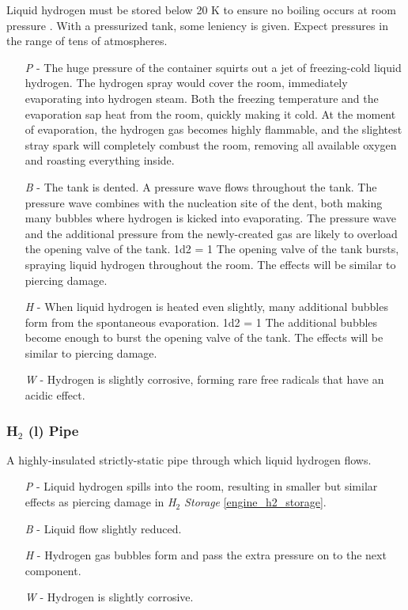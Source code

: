\documentclass[a4paper]{article}
\begin{document}
Liquid hydrogen must be stored below 20 K to ensure no boiling occurs at room pressure \cite{international_temperature_scale_of_1968}. With a pressurized tank, some leniency is given. Expect pressures in the range of tens of atmospheres.
\begin{enumerate}
\item [\textit{P}] - The huge pressure of the container squirts out a jet of freezing-cold liquid hydrogen. The hydrogen spray would cover the room, immediately evaporating into hydrogen steam. Both the freezing temperature and the evaporation sap heat from the room, quickly making it cold. At the moment of evaporation, the hydrogen gas becomes highly flammable, and the slightest stray spark will completely combust the room, removing all available oxygen and roasting everything inside.
\item [\textit{B}] - The tank is dented. A pressure wave flows throughout the tank. The pressure wave combines with the nucleation site of the dent, both making many bubbles where hydrogen is kicked into evaporating. The pressure wave and the additional pressure from the newly-created gas are likely to overload the opening valve of the tank. \newline \hspace{-3pt} 1d2 = 1 The opening valve of the tank bursts, spraying liquid hydrogen throughout the room. The effects will be similar to piercing damage.
\item [\textit{H}] - When liquid hydrogen is heated even slightly, many additional bubbles form from the spontaneous evaporation. \newline \hspace{3pt} 1d2 = 1 The additional bubbles become enough to burst the opening valve of the tank. The effects will be similar to piercing damage.
\item [\textit{W}] - Hydrogen is slightly corrosive, forming rare free radicals that have an acidic effect.
\end{enumerate}

\vspace{-0.5cm} \hspace{-18pt} \subsubsection{H$_2$ (l) Pipe} \label{engine_h2_pipe} \vspace{-0.2cm}
A highly-insulated strictly-static pipe through which liquid hydrogen flows.
\begin{enumerate}
\item [\textit{P}] - Liquid hydrogen spills into the room, resulting in smaller but similar effects as piercing damage in \textit{H$_2$ Storage} \ref{engine_h2_storage}.
\item [\textit{B}] - Liquid flow slightly reduced.
\item [\textit{H}] - Hydrogen gas bubbles form and pass the extra pressure on to the next component.
\item [\textit{W}] - Hydrogen is slightly corrosive.
\end{enumerate}
\end{document}
